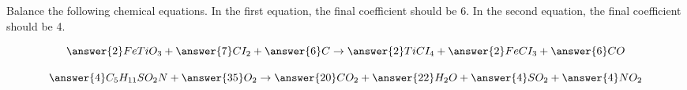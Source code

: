 \documentclass{ximera}
\author{Zack Reed}
\begin{document}
\begin{problem}

Balance the following chemical equations. In the first equation, the final coefficient should be 6. In the second equation, the final coefficient should be 4.



    $$\answer{2} FeTiO_3+\answer{7} CI_2+\answer{6} C\rightarrow \answer{2} TiCI_4+\answer{2} FeCI_3+\answer{6} CO$$

    
    
    $$\answer{4} C_5H_{11} SO_2N+\answer{35} O_2\rightarrow \answer{20} CO_2+\answer{22} H_2O+\answer{4} SO_2+\answer{4} NO_2$$



\end{problem}
\end{document}
